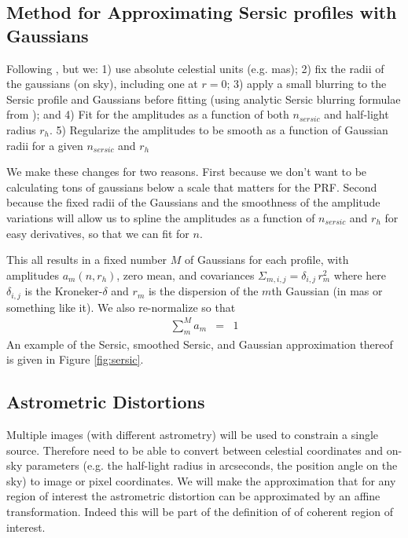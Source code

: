 \documentclass[modern]{aastex62}
\renewcommand{\det}[1]{||{#1}||}
\begin{document}
\subsection{Method for Approximating Sersic profiles with Gaussians}
Following \citet{hogg_mog}, but we: 
  1) use absolute celestial units (e.g. mas); 
  2) fix the radii of the gaussians (on sky), including one at $r=0$;
  3) apply a small blurring to the Sersic profile and Gaussians before fitting (using analytic Sersic blurring formulae from \citet{trujillo01}); and
  4) Fit for the amplitudes as a function of both $n_{sersic}$ and half-light radius $r_h$.
  5) Regularize the amplitudes to be smooth as a function of Gaussian radii  for a given $n_{sersic}$ and $r_h$

We make these changes for two reasons.
First because we don't want to be calculating tons of gaussians below a scale that matters for the PRF.
Second because the fixed radii of the Gaussians and the smoothness of the amplitude variations will allow us to spline the amplitudes as a function of $n_{sersic}$ and $r_h$ for easy derivatives, so that we can fit for $n$.

This all results in a fixed number $M$ of Gaussians for each profile,
with amplitudes $a_m(n, r_h)$, zero mean, and covariances $\Sigma_{m,i,j} = \delta_{i,j} \, r_m^2$ 
where here $\delta_{i,j}$ is the Kroneker-$\delta$ and $r_m$ is the dispersion  of the $m$th  Gaussian (in mas or something like it).
We also re-normalize so that 
\begin{eqnarray}
\sum_m^M a_m & = & 1
\end{eqnarray}
An example of the Sersic, smoothed Sersic, and Gaussian approximation thereof is given in Figure \ref{fig:sersic}.  


\subsection{Astrometric Distortions}
Multiple images (with different astrometry) will be used to constrain a single source.
Therefore need to be able to convert between celestial coordinates and on-sky parameters (e.g. the half-light radius in arcseconds, the position angle on the sky) to image or pixel coordinates.
We will make the approximation that for any region of interest the astrometric distortion can  be approximated by an affine transformation.
Indeed this will be part of the definition of of coherent region of interest.
\end{document}
